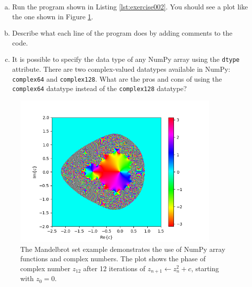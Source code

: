 \begin{enumerate}
        

        \begin{enumerate}[a)]
          \item Run the program shown in Listing \ref{lst:exercise002}. You
                should see a plot like the one shown in Figure \ref{fig:mandelbrot}.
          \item Describe what each line of the program does by adding comments to the code.
          \item It is possible to specify the data type of any NumPy array
                using the \verb|dtype| attribute. There are two complex-valued
                datatypes available in NumPy: \verb|complex64| and \verb|complex128|.
                What are the pros and cons of using the \verb|complex64| datatype
                instead of the \verb|complex128| datatype?
        \end{enumerate}


        \begin{figure}
          \includegraphics[width=0.9\textwidth]{ch02/figures/mystery.png}
          \caption{The Mandelbrot set example demonstrates the use of NumPy array functions and complex numbers. The plot
            shows the phase of complex number $z_{12}$ after 12 iterations of
            $z_{n+1} \leftarrow z_n^2 + c$, starting with $z_0 = 0$.}
          \label{fig:mandelbrot}
        \end{figure}

\end{enumerate}
